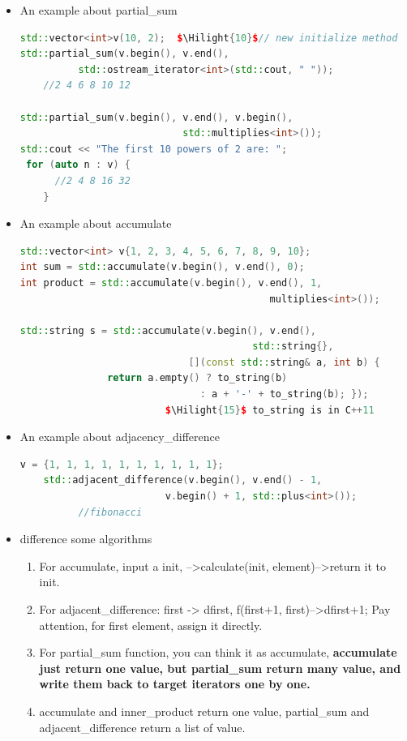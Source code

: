 \documentclass[a4paper,11pt,twoside]{book}
\newcommand{\Hilight}[1]{\makebox[0pt][l]{\color{yellow}\rule[-3pt]{#1em}{11pt}}}
\newcommand{\Hilight}[1]{}
\begin{document}
\begin{itemize}

\item An example about partial\_sum

\begin{lstlisting}[frame=single, language=c++, mathescape=true]
std::vector<int>v(10, 2);  $\Hilight{10}$// new initialize method
std::partial_sum(v.begin(), v.end(),
          std::ostream_iterator<int>(std::cout, " "));
    //2 4 6 8 10 12

std::partial_sum(v.begin(), v.end(), v.begin(),
                            std::multiplies<int>());
std::cout << "The first 10 powers of 2 are: ";
 for (auto n : v) {
      //2 4 8 16 32
    }
\end{lstlisting}
\item An example about accumulate

\begin{lstlisting}[frame=single, language=c++, mathescape=true]
std::vector<int> v{1, 2, 3, 4, 5, 6, 7, 8, 9, 10};
int sum = std::accumulate(v.begin(), v.end(), 0);
int product = std::accumulate(v.begin(), v.end(), 1,
                                           multiplies<int>());

std::string s = std::accumulate(v.begin(), v.end(),
                                        std::string{},
                             [](const std::string& a, int b) {
               return a.empty() ? to_string(b)
                               : a + '-' + to_string(b); });
                         $\Hilight{15}$ to_string is in C++11
\end{lstlisting}

\item An example about adjacency\_difference
\begin{lstlisting}[frame=single, language=c++, mathescape=true]
 v = {1, 1, 1, 1, 1, 1, 1, 1, 1, 1};
    std::adjacent_difference(v.begin(), v.end() - 1,
                         v.begin() + 1, std::plus<int>());
          //fibonacci
\end{lstlisting}

\item difference some algorithms
\begin{enumerate}
\item For accumulate, input a init, -->calculate(init, element)-->return it to init.
\item For adjacent\_difference:   first -> dfirst,  f(first+1, first)-->dfirst+1; Pay attention, for first element, assign it directly.
\item For partial\_sum function, you can think it as accumulate, \textbf{accumulate just return one value, but partial\_sum return many value, and write them back to target iterators one by one.  }
\item accumulate and inner\_product return one value, partial\_sum and adjacent\_difference return a list of value.
\end{enumerate}

\end{itemize}
\end{document}
